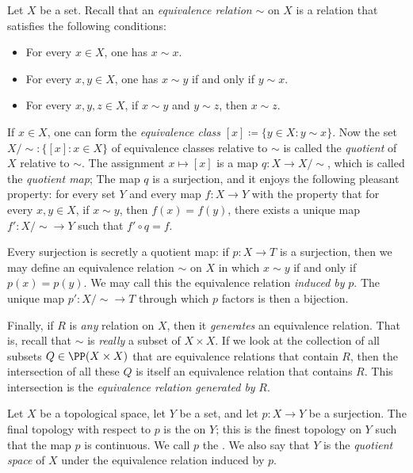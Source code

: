 	
\begin{nul}
	Let $X$ be a set.
	Recall that an \emph{equivalence relation} $\sim$ on $X$ is a relation that satisfies the following conditions:
	\begin{itemize}
		\item For every $x \in X$, one has $x \sim x$.
		\item For every $x,y \in X$, one has $x \sim y $ if and only if $y \sim x $.
		\item For every $x,y,z \in X$, if $x \sim y$ and $y \sim z$, then $x \sim z$.
	\end{itemize}
	If $ x \in X$, one can form the \emph{equivalence class} $[x] \coloneq \{ y \in X : y \sim x \}$.
	Now the set $X/\!\sim \colon \{ [x] : x \in X \}$ of equivalence classes relative to $\sim$ is called the \emph{quotient} of $X$ relative to $\sim$.
	The assignment $ x \mapsto [x]$ is a map $ q \colon X \to X/\!\sim$, which is called the \emph{quotient map};
	The map $q$ is a surjection, and it enjoys the following pleasant property:
	for every set $Y$ and every map $f \colon X \to Y$ with the property that for every $x, y \in X$, if $x \sim y$, then $f(x) = f(y)$, there exists a unique map $f' \colon X/\!\sim \to Y$
	such that $f' \circ q = f $.

	Every surjection is secretly a quotient map: if $ p \colon X \to T $ is a surjection, then we may define an equivalence relation $ \sim $ on $X$ in which $x \sim y$ if and only if $p(x) = p(y)$.
	We may call this the equivalence relation \emph{induced by} $p$.
	The unique map $p' \colon X/\!\sim \to T$ through which $p$ factors is then a bijection.

	Finally, if $R$ is \emph{any} relation on $X$, then it \emph{generates} an equivalence relation.
	That is, recall that $\sim$ is \emph{really} a subset%
	of $ X \times X $.
	If we look at the collection of all subsets $Q \in \PP(X \times X)$ that are equivalence relations that contain $R$, then the intersection of all these $Q$ is itself an equivalence relation that contains $R$.
	This intersection is the \emph{equivalence relation generated by} $R$.
\end{nul}

\begin{dfn}
	Let $X$ be a topological space, let $Y$ be a set, and let $p \colon X \to Y $ be a surjection.
	The final topology with respect to $p$ is the  on $Y$;
	this is the finest topology on $Y$ such that the map $p$ is continuous.
	We call $p$ the .
	We also say that $Y$ is the \emph{quotient space} of $X$ under the equivalence relation induced by $p$.
\end{dfn}

